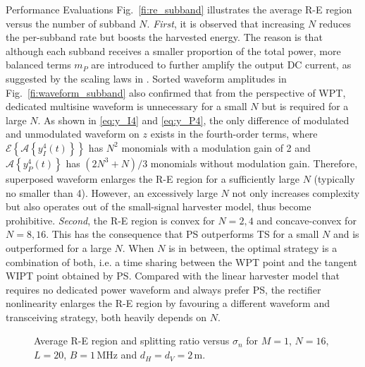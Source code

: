 \documentclass[journal]{IEEEtran}
\begin{document}
\begin{section}{Performance Evaluations}
		Fig.~\ref{fi:re_subband} illustrates the average R-E region versus the number of subband $N$. \textit{First}, it is observed that increasing $N$ reduces the per-subband rate but boosts the harvested energy. The reason is that although each subband receives a smaller proportion of the total power, more balanced terms $m_P$ are introduced to further amplify the output DC current, as suggested by the scaling laws in \cite{Clerckx2018b}. Sorted waveform amplitudes in Fig.~\ref{fi:waveform_subband} also confirmed that from the perspective of WPT, dedicated multisine waveform is unnecessary for a small $N$ but is required for a large $N$. As shown in \ref{eq:y_I4} and \ref{eq:y_P4}, the only difference of modulated and unmodulated waveform on $z$ exists in the fourth-order terms, where $\mathcal{E}\left\{\mathcal{A}\left\{y_{I}^4(t)\right\}\right\}$ has $N^2$ monomials with a modulation gain of \num{2} and $\mathcal{A}\left\{y_{P}^4(t)\right\}$ has $(2N^3+N)/3$ monomials without modulation gain. Therefore, superposed waveform enlarges the R-E region for a sufficiently large $N$ (typically no smaller than 4). However, an excessively large $N$ not only increases complexity but also operates out of the small-signal harvester model, thus become prohibitive. \textit{Second}, the R-E region is convex for $N = 2, 4$ and concave-convex for $N = 8, 16$. This has the consequence that PS outperforms TS for a small $N$ and is outperformed for a large $N$. When $N$ is in between, the optimal strategy is a combination of both, i.e. a time sharing between the WPT point and the tangent WIPT point obtained by PS. Compared with the linear harvester model that requires no dedicated power waveform and always prefer PS, the rectifier nonlinearity enlarges the R-E region by favouring a different waveform and transceiving strategy, both heavily depends on $N$.

		\begin{figure}[!t]
			\centering
			\begin{adjustbox}{width=\linewidth}
				
			\end{adjustbox}
			\caption{Average R-E region and splitting ratio versus $\sigma_n$ for $M=1$, $N=16$, $L=20$, $B=1\,\si{\MHz}$ and $d_H=d_V=2\,\si{\meter}$.}
			\label{fi:re_noise}
		\end{figure}


\end{section}
\end{document}
